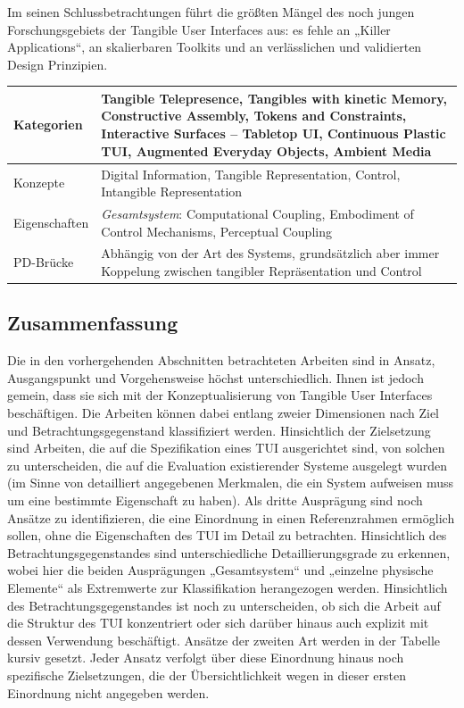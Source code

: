 Im seinen Schlussbetrachtungen führt \citeauthor{Ishii08} die größten Mängel des noch jungen Forschungsgebiets der Tangible User Interfaces aus: es fehle an „Killer Applications“, an skalierbaren Toolkits und an verlässlichen und validierten Design Prinzipien.
\\[1em]
\begin{tabular}{| p{3cm} | p{10cm} |}
  \hline
  Kategorien & Tangible Telepresence, Tangibles with kinetic Memory, Constructive Assembly, Tokens and Constraints, Interactive Surfaces -- Tabletop UI, Continuous Plastic TUI, Augmented Everyday Objects, Ambient Media \\ \hline
  Konzepte & Digital Information, Tangible Representation, Control, Intangible Representation \\ \hline
  Eigenschaften & \emph{Gesamtsystem}: Computational Coupling, Embodiment of Control Mechanisms, Perceptual Coupling \\ \hline
  PD-Brücke & Abhängig von der Art des Systems, grundsätzlich aber immer Koppelung zwischen tangibler Repräsentation und Control \\ \hline
\end{tabular} 


\subsection{Zusammenfassung} %
\label{sub:tui_konzepte_zusammenfassung}

Die in den vorhergehenden Abschnitten betrachteten Arbeiten sind in Ansatz, Ausgangspunkt und Vorgehensweise höchst unterschiedlich. Ihnen ist jedoch gemein, dass sie sich mit der Konzeptualisierung von Tangible User Interfaces beschäftigen. Die Arbeiten können dabei entlang zweier Dimensionen nach Ziel und Betrachtungsgegenstand klassifiziert werden. Hinsichtlich der Zielsetzung sind Arbeiten, die auf die Spezifikation eines \gls{TUI} ausgerichtet sind, von solchen zu unterscheiden, die auf die Evaluation existierender Systeme ausgelegt wurden (im Sinne von detailliert angegebenen Merkmalen, die ein System aufweisen muss um eine bestimmte Eigenschaft zu haben). Als dritte Ausprägung sind noch Ansätze zu identifizieren, die eine Einordnung in einen Referenzrahmen ermöglich sollen, ohne die Eigenschaften des \gls{TUI} im Detail zu betrachten. Hinsichtlich des Betrachtungsgegenstandes sind unterschiedliche Detaillierungsgrade zu erkennen, wobei hier die beiden Ausprägungen „Gesamtsystem“ und „einzelne physische Elemente“ als Extremwerte zur Klassifikation herangezogen werden. Hinsichtlich des Betrachtungsgegenstandes ist noch zu unterscheiden, ob sich die Arbeit auf die Struktur des \gls{TUI} konzentriert oder sich darüber hinaus auch explizit mit dessen Verwendung beschäftigt. Ansätze der zweiten Art werden in der Tabelle kursiv gesetzt. Jeder Ansatz verfolgt über diese Einordnung hinaus noch spezifische Zielsetzungen, die der Übersichtlichkeit wegen in dieser ersten Einordnung nicht angegeben werden. 

